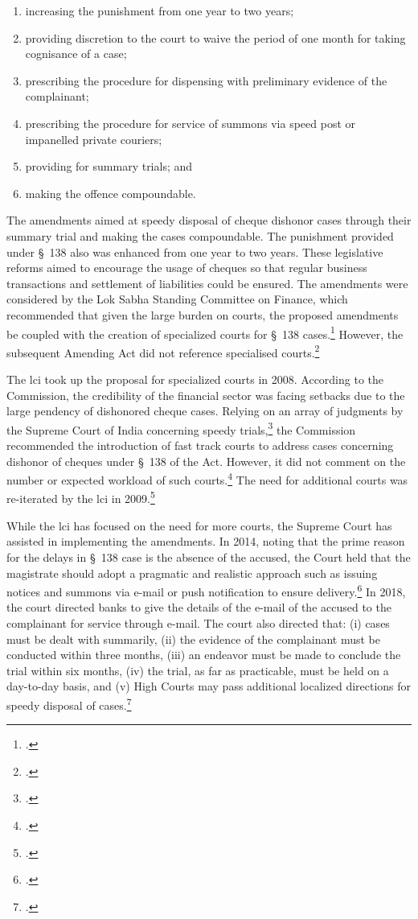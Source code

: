 \documentclass[12pt,a4paper]{article}
\begin{document}
	\begin{enumerate}[label=(\alph*)]
		\item increasing the punishment from one year to two years;
		\item providing discretion to the court to waive the period of one month for taking cognisance of a case;
		\item prescribing the procedure for dispensing with preliminary evidence of the complainant;
		\item prescribing the procedure for service of summons via speed post or impanelled private couriers;
		\item providing for summary trials; and
		\item making the offence compoundable.
	\end{enumerate}
	
	The amendments aimed at speedy disposal of cheque dishonor cases through their summary trial and making the cases compoundable. The punishment provided under \S~138 also was enhanced from one year to two years. These legislative
	reforms aimed to encourage the usage of cheques so that regular business transactions and settlement of liabilities could be ensured. The amendments were considered by the Lok Sabha Standing Committee on Finance, which recommended that given the large burden on courts, the proposed amendments be coupled with the creation of specialized courts for \S~138 cases.\footcite{stdcomm2001_138niAct} However, the subsequent Amending Act did not reference specialised courts.\footcite{niAmend2002} 
	
	The \gls{lci} took up the proposal for specialized courts in 2008. According to the Commission, the credibility of the financial sector was facing setbacks due to the large pendency of dishonored cheque cases. Relying on an array of judgments by the Supreme Court of India concerning speedy trials,\footcite{sc1978_khatoon, sc1981_champalal, sc2005_surinder, sc2008_krishna} the Commission recommended the introduction of fast track courts to address cases concerning dishonor of cheques under \S~138 of the Act. However, it did not comment on the number or expected workload of such courts.\footcite{lci2008_138} The need for additional courts was re-iterated by the \gls{lci} in 2009.\footcite{lci2009_reforms}
	
	While the \gls{lci} has focused on the need for more courts, the Supreme Court has assisted in implementing the amendments. In 2014, noting that the prime reason for the delays in \S~138 case is the absence of the accused, the Court held that the magistrate should adopt a pragmatic and realistic approach such as issuing notices and summons via e-mail or push notification to ensure delivery.\footcite{sc2014_iba} In 2018, the court directed banks to give the details of the e-mail of the accused to the complainant for service through e-mail. The court also directed that: (i) cases must be dealt with summarily, (ii) the evidence of the complainant must be conducted within three months, (iii) an endeavor must be made to conclude the trial within six months, (iv) the trial, as far as practicable, must be held on a day-to-day basis, and (v) High Courts may pass additional localized directions for speedy disposal of cases.\footcite{sc2018_meters}
	
\end{document}
